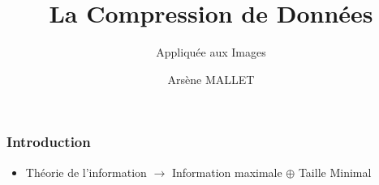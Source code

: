 \documentclass{beamer}
\title{La Compression de Donn\'ees}
\subtitle{Appliquée aux Images}
\author{Ars\`ene MALLET}
\date{}
\institute{Numéro Candidat : 14873}
\begin{document}
\frame{\titlepage}

\begin{frame}
    \frametitle{Introduction}

    \begin{itemize}
        \item Th\'eorie de l'information $\rightarrow$ Information maximale $\oplus$ Taille Minimal
    \end{itemize}
\end{frame}
\end{document}
